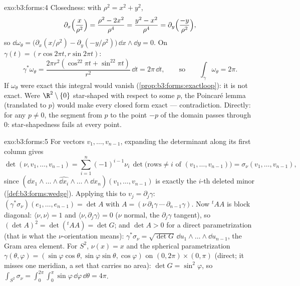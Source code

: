 \begin{solution}{exo:b3:forms:4}
Closedness: with $\rho^2 = x^2 + y^2$,
\[
\partial_x\Bigl(\frac{x}{\rho^2}\Bigr) = \frac{\rho^2 -
2x^2}{\rho^4} = \frac{y^2 - x^2}{\rho^4} =
\partial_y\Bigl(\frac{-y}{\rho^2}\Bigr),
\]
so $\dd\omega_\theta = \bigl(\partial_x(x/\rho^2) -
\partial_y(-y/\rho^2)\bigr)\,\dd x\wedge\dd y = 0$. On
$\gamma(t) = (r\cos2\pi t, r\sin2\pi t)$:
\[
\gamma^*\omega_\theta = \frac{2\pi r^2(\cos^22\pi t +
\sin^22\pi t)}{r^2}\,\dd t = 2\pi\,\dd t,
\qquad\text{so}\qquad
\int_\gamma\omega_\theta = 2\pi .
\] If $\omega_\theta$ were
exact this integral would vanish
(\cref{prop:b3:forms:exactloop}): it is not exact. Were
$\R^2\setminus\{0\}$ star-shaped with respect to some $p$,
the Poincar\'e lemma (translated to $p$) would make every
closed form exact --- contradiction. Directly: for any $p
\neq 0$, the segment from $p$ to the point $-p$ of the
domain passes through $0$: star-shapedness fails at every
point.
\end{solution}

\begin{solution}{exo:b3:forms:5}
For vectors $v_1, \dots, v_{n-1}$, expanding the determinant
along its first column gives
\[
\det(\nu, v_1, \dots, v_{n-1}) =
\sum_{i=1}^n(-1)^{i-1}\nu_i\,
\det\bigl(\text{rows} \neq i \text{ of } (v_1, \dots,
v_{n-1})\bigr)
= \sigma_\nu(v_1, \dots, v_{n-1}),
\]
since $(\dd x_1\wedge\dots\wedge\widehat{\dd
x_i}\wedge\dots\wedge\dd x_n)(v_1, \dots, v_{n-1})$ is
exactly the $i$-th deleted minor
(\cref{def:b3:forms:wedge}). Applying this to $v_j =
\partial_j\gamma$: $(\gamma^*\sigma_\nu)(e_1, \dots,
e_{n-1}) = \det A$ with $A = (\nu\ \partial_1\gamma\ \cdots\
\partial_{n-1}\gamma)$. Now ${}^t\!AA$ is block diagonal:
$\langle\nu, \nu\rangle = 1$ and $\langle\nu,
\partial_j\gamma\rangle = 0$ ($\nu$ normal, the
$\partial_j\gamma$ tangent), so $(\det A)^2 =
\det({}^t\!AA) = \det G$; and $\det A > 0$ for a direct
parametrization (that is what the $\nu$-orientation means):
$\gamma^*\sigma_\nu = \sqrt{\det G}\,\dd
u_1\wedge\dots\wedge\dd u_{n-1}$, the Gram area element. For
$S^2$, $\nu(x) = x$ and the spherical parametrization
$\gamma(\theta, \varphi) = (\sin\varphi\cos\theta,
\sin\varphi\sin\theta, \cos\varphi)$ on
$(0,2\pi)\times(0,\pi)$ (direct; it misses one meridian, a
set that carries no area): $\det G = \sin^2\varphi$, so
$\int_{S^2}\sigma_\nu =
\int_0^{2\pi}\!\!\int_0^\pi\sin\varphi\,\dd\varphi\,
\dd\theta = 4\pi$.
\end{solution}


